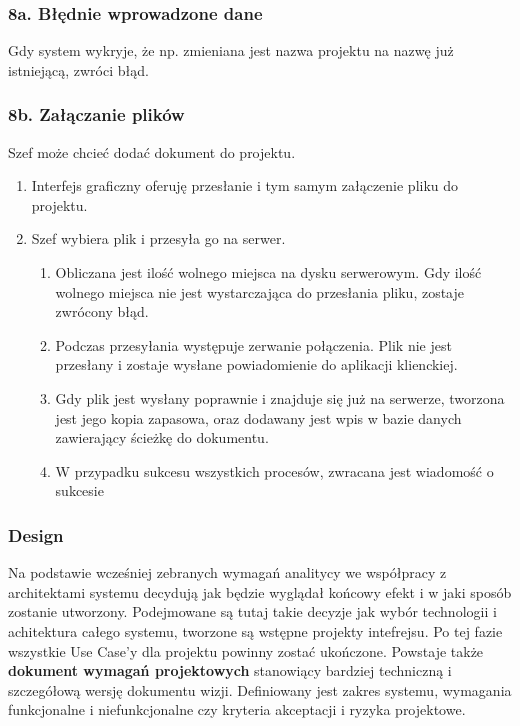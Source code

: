 \documentclass{article}
\begin{document}
\subsubsection*{8a. Błędnie wprowadzone dane}
Gdy system wykryje, że np. zmieniana jest nazwa projektu na nazwę już istniejącą, zwróci błąd.

\subsubsection*{8b. Załączanie plików}
Szef może chcieć dodać dokument do projektu.
\begin{enumerate}
    \item Interfejs graficzny oferuję przesłanie i tym samym załączenie pliku do projektu.
    \item Szef wybiera plik i przesyła go na serwer.
          \begin{enumerate}
              \item Obliczana jest ilość wolnego miejsca na dysku serwerowym. Gdy ilość wolnego miejsca nie jest wystarczająca do przesłania pliku, zostaje zwrócony błąd.
              \item Podczas przesyłania występuje zerwanie połączenia. Plik nie jest przesłany i zostaje wysłane powiadomienie do aplikacji klienckiej.
              \item Gdy plik jest wysłany poprawnie i znajduje się już na serwerze, tworzona jest jego kopia zapasowa, oraz dodawany jest wpis w bazie danych zawierający ścieżkę do dokumentu.
              \item W przypadku sukcesu wszystkich procesów, zwracana jest wiadomość o sukcesie
          \end{enumerate}
\end{enumerate}

\subsubsection*{Design}
Na podstawie wcześniej zebranych wymagań analitycy we współpracy z architektami systemu decydują jak będzie wyglądał końcowy efekt i w jaki sposób zostanie utworzony. Podejmowane są tutaj takie decyzje jak wybór technologii i achitektura całego systemu, tworzone są wstępne projekty intefrejsu. Po tej fazie wszystkie Use Case'y dla projektu powinny zostać ukończone. Powstaje także \textbf{dokument wymagań projektowych} stanowiący bardziej techniczną i szczegółową wersję dokumentu wizji. Definiowany jest zakres systemu, wymagania funkcjonalne i niefunkcjonalne czy kryteria akceptacji i ryzyka projektowe.
\end{document}
